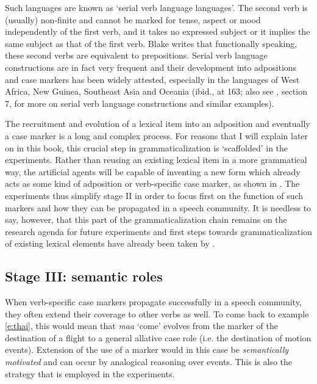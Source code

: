 Such languages are known as `serial verb language languages'. The second verb is (usually) non-finite and cannot be marked for tense, aspect or mood independently of the first verb, and it takes no expressed subject or it implies the same subject as that of the first verb. Blake writes that functionally speaking, these second verbs are equivalent to prepositions. Serial verb language constructions are in fact very frequent and their development into adpositions and case markers has been widely attested, especially in the languages of West Africa, New Guinea, Southeast Asia and Oceania (ibid., at 163; also see \citealp{givon97introduction}, section 7, for more on serial verb language constructions and similar examples).

The recruitment and evolution of a lexical item into an adposition and eventually a case marker is a long and complex process. For reasons that I will explain later on in this book, this crucial step in grammaticalization is `scaffolded' in the experiments. Rather than reusing an existing lexical item in a more grammatical way, the artificial agents will be capable of inventing a new form which already acts as some kind of adposition or verb-specific case marker, as shown in . The experiments thus simplify stage II in order to focus first on the function of such markers and how they can be propagated in a speech community. It is needless to say, however, that this part of the grammaticalization chain remains on the research agenda for future experiments and first steps towards grammaticalization of existing lexical elements have already been taken by \citet{wellens08flexible}.

\subsection{Stage III: semantic roles}
\label{s:stage3}

When verb-specific case markers propagate successfully in a speech community, they often extend their coverage to other verbs as well. To come back to example \ref{e:thai}, this would mean that {\em maa} `come' evolves from the marker of the destination of a flight to a general allative case role (i.e. the destination of motion events). Extension of the use of a marker would in this case be {\em semantically motivated} and can occur by analogical reasoning over events. This is also the strategy that is employed in the experiments. 

